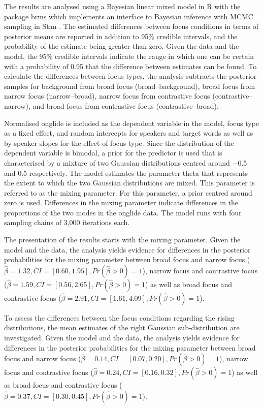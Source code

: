 The results are analysed using a Bayesian linear mixed model in R \citep{RCoreTeam2018} with the package brms \citep{Buerkner2018} which implements an interface to Bayesian inference with MCMC sampling in Stan \citep{Carpenteretal2017}. The estimated differences between focus conditions in terms of posterior means are reported in addition to 95\% credible intervals, and the probability of the estimate being greater than zero. Given the data and the model, the 95\% credible intervals indicate the range in which one can be certain with a probability of 0.95 that the difference between estimates can be found. To calculate the differences between focus types,  the analysis subtracts the posterior samples for background from broad focus (broad–background), broad focus from narrow focus (narrow–broad), narrow focus from contrastive focus (contrastive–narrow), and broad focus from contrastive focus (contrastive–broad).

Normalised onglide is included as the dependent variable in the model, focus type as a fixed effect, and random intercepts for speakers and target words as well as by-speaker slopes for the effect of focus type. Since the distribution of the dependent variable is bimodal, a prior for the predictor is used that is characterised by a mixture of two Gaussian distributions centred around −0.5 and 0.5 respectively. The model estimates the parameter theta that represents the extent to which the two Gaussian distributions are mixed. This parameter is referred to as the mixing parameter. For this parameter, a prior centred around zero is used. Differences in the mixing parameter indicate differences in the proportions of the two modes in the onglide data. The model runs with four sampling chains of 3,000 iterations each.

The presentation of the results starts with the mixing parameter. Given the model and the data, the analysis yields evidence for differences in the posterior probabilities for the mixing parameter between broad focus and narrow focus ($\hat\beta=1.32, CI=[0.60, 1.95], \allowbreak Pr(\hat\beta>0)=1$), narrow focus and contrastive focus ($\hat\beta=1.59, CI=[0.56, 2.65], \allowbreak Pr(\hat\beta>0)=1$) as well as broad focus and contrastive focus ($\hat\beta=2.91, CI=[1.61, 4.09], \allowbreak Pr(\hat\beta>0)=1$).

To assess the differences between the focus conditions regarding the rising distributions, the mean estimates of the right Gaussian sub-distribution are investigated. Given the model and the data, the analysis yields evidence for differences in the posterior probabilities for the mixing parameter between broad focus and narrow focus ($\hat\beta=0.14, CI=[0.07, 0.20], \allowbreak Pr(\hat\beta>0)=1$), narrow focus and contrastive focus ($\hat\beta=0.24, CI=[0.16, 0.32], \allowbreak Pr(\hat\beta>0)=1$) as well as broad focus and contrastive focus ($\hat\beta=0.37, CI=[0.30, 0.45], \allowbreak Pr(\hat\beta>0)=1$).


